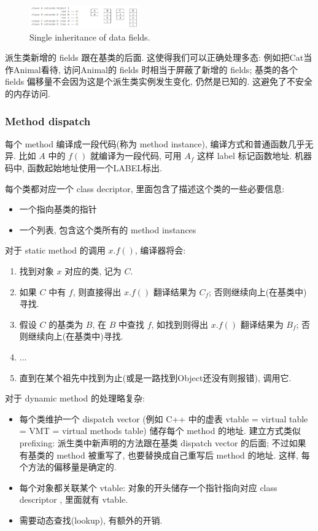 \begin{figure}[!htb]
    \centering
    \includegraphics[width=0.42\textwidth]{pic/CP14/Single inheritance of data fields.}
    \caption{Single inheritance of data fields.}
\end{figure}


派生类新增的 fields 跟在基类的后面.  这使得我们可以正确处理多态: 例如把Cat当作Animal看待, 访问Animal的 fields 时相当于屏蔽了新增的 fields; 基类的各个 fields 偏移量不会因为这是个派生类实例发生变化, 仍然是已知的. 这避免了不安全的内存访问. 

\subsubsection{Method dispatch}
每个 method 编译成一段代码(称为 method instance), 编译方式和普通函数几乎无异. 比如 $A$ 中的 $f()$ 就编译为一段代码, 可用 $A_f$ 这样 label 标记函数地址. 机器码中, 函数起始地址使用一个LABEL标出. 

每个类都对应一个 class decriptor, 里面包含了描述这个类的一些必要信息: 
\begin{itemize}
    \item 一个指向基类的指针
    \item 一个列表, 包含这个类所有的 method instances
\end{itemize}

对于 static method 的调用 $x.f()$, 编译器将会: 
\begin{enumerate}
    \item 找到对象 $x$ 对应的类, 记为 $C$.
    \item 如果 $C$ 中有 $f$, 则直接得出 $x.f()$ 翻译结果为 $C_f$; 否则继续向上(在基类中)寻找. 
    \item 假设 $C$ 的基类为 $B$, 在 $B$ 中查找 $f$, 如找到则得出 $x.f()$ 翻译结果为 $B_f$; 否则继续向上(在基类中)寻找. 
    \item $\dots$
    \item 直到在某个祖先中找到为止(或是一路找到Object还没有则报错), 调用它. 
\end{enumerate}

对于 dynamic method 的处理略复杂:
\begin{itemize}
    \item 每个类维护一个 dispatch vector (例如 C++ 中的虚表 vtable = virtual table = VMT = virtual methods table) 储存每个 method 的地址. 
    \subitem 建立方式类似 prefixing: 派生类中新声明的方法跟在基类 dispatch vector 的后面; 不过如果有基类的 method 被重写了, 也要替换成自己重写后 method 的地址. 这样, 每个方法的偏移量是确定的. 
    \item 每个对象都关联某个 vtable: 对象的开头储存一个指针指向对应 class descriptor , 里面就有 vtable. 
    \item 需要动态查找(lookup), 有额外的开销. 
\end{itemize}


